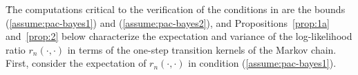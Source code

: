 \documentclass[11pt]{amsart}
\begin{document}
\.The computations critical to the verification of the conditions in  are the bounds (\ref{assume:pac-bayes1}) and (\ref{assume:pac-bayes2}), and %
Propositions~\ref{prop:1a} and~\ref{prop:2} below characterize the expectation and variance of the log-likelihood ratio $r_n(\cdot,\cdot)$ in terms of the one-step transition kernels of the Markov chain.  First, consider the expectation of $r_n(\cdot,\cdot)$ in condition (\ref{assume:pac-bayes1}). 
\end{document}
